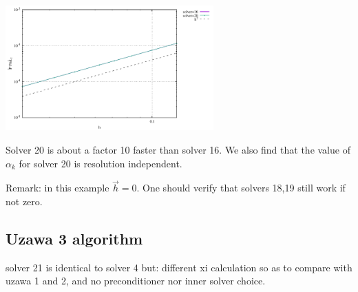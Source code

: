 \begin{center}
\includegraphics[width=8cm]{python_codes/fieldstone_147/RESULTS/L2/uzawa2/errorsP.pdf}
\end{center}

Solver 20 is about a factor 10 faster than solver 16.
We also find that the value of $\alpha_k$ for solver 20 is resolution independent.

Remark: in this example $\vec{h}=0$. One should verify that solvers 18,19 still work if not zero.

\subsection*{Uzawa 3 algorithm}

solver 21 is identical to solver 4 but: different xi calculation so as to 
compare with uzawa 1 and 2, and no preconditioner nor inner solver choice. 



